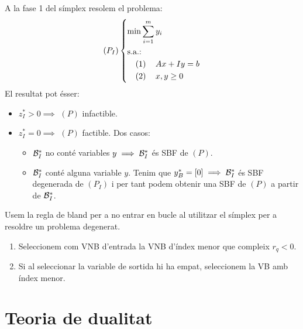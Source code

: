 \begin{obs}
    A la fase 1 del símplex resolem el problema:
    \begin{equation*}
        \lp P_I \rp \begin{dcases*}
            \min \sum_{i = 1}^m y_i \\
            \text{s.a.: } \\
            \quad \left( 1 \right) \quad Ax + Iy = b \\
            \quad \left( 2 \right) \quad x, y \geq 0 \\
        \end{dcases*}
    \end{equation*}
    El resultat pot ésser:
    \begin{itemize}
        \item $z_I^* > 0 \implies$ $(P)$ infactible.
        \item $z_I^* = 0 \implies$ $(P)$ factible. Dos casos:
            \begin{itemize}
                \item $\mathcal{B}_I^*$ no conté variables $y \implies \mathcal{B}_I^*$ és SBF de $(P)$.
                \item $\mathcal{B}_I^*$ conté alguna variable $y$. Tenim que $y_B^* = [0] \implies \mathcal{B}_I^*$ és SBF degenerada de $(P_I)$ i per tant podem obtenir una SBF de $(P)$ a partir de $\mathcal{B}_I^*$.
            \end{itemize}
    \end{itemize}
\end{obs}
\begin{regl}[de Bland]
    Usem la regla de bland per a no entrar en bucle al utilitzar el símplex per a resoldre un problema degenerat.
    \begin{enumerate}
        \item Seleccionem com VNB d'entrada la VNB d'índex menor que compleix $r_q < 0$.
        \item Si al seleccionar la variable de sortida hi ha empat, seleccionem la VB amb índex menor.
    \end{enumerate}
\end{regl}

\section{Teoria de dualitat}

